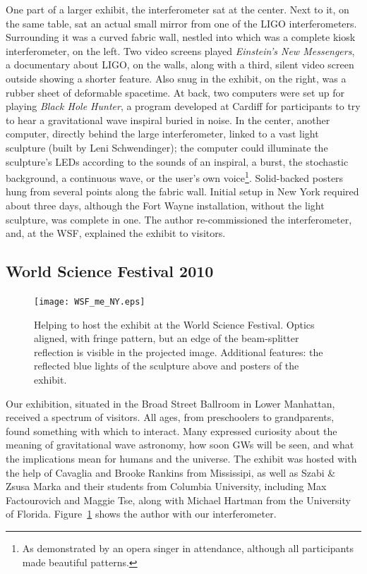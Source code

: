 One part of a larger exhibit, the interferometer sat at the center.
Next to it, on the same table, sat an actual small mirror from one of the LIGO interferometers.
Surrounding it was a curved fabric wall, nestled into which was a complete kiosk interferometer, on the left.
Two video screens played \textit{Einstein's New Messengers}, a documentary about LIGO, on the walls, along with a third, silent video screen outside showing a shorter feature.
Also snug in the exhibit, on the right, was a rubber sheet of deformable spacetime.
At back, two computers were set up for playing \textit{Black Hole Hunter}, a program developed at Cardiff for participants to try to hear a gravitational wave inspiral buried in noise.
In the center, another computer, directly behind the large interferometer, linked to a vast light sculpture (built by Leni Schwendinger); the computer could illuminate the sculpture's LEDs according to the sounds of an inspiral, a burst, the stochastic background, a continuous wave, or the user's own voice\footnote{As demonstrated by an opera singer in attendance, although all participants made beautiful patterns.}.
Solid-backed posters hung from several points along the fabric wall.
Initial setup in New York required about three days, although the Fort Wayne installation, without the light sculpture, was complete in one.
The author re-commissioned the interferometer, and, at the WSF, explained the exhibit to visitors.

        \subsection{World Science Festival 2010}
        \label{WSF2010}


	\begin{figure}
	\begin{center}
	\texttt{[image: WSF\_me\_NY.eps]}
	\caption{Helping to host the exhibit at the World Science Festival. Optics aligned, with fringe pattern, but an edge of the beam-splitter reflection is visible in the projected image. Additional features: the reflected blue lights of the sculpture above and posters of the exhibit.}
	\label{WSF_IFO_me}
	\end{center}
	\end{figure}

Our exhibition, situated in the Broad Street Ballroom in Lower Manhattan, received a spectrum of visitors.
All ages, from preschoolers to grandparents, found something with which to interact.
Many expressed curiosity about the meaning of gravitational wave astronomy, how soon GWs will be seen, and what the implications mean for humans and the universe.
The exhibit was hosted with the help of Cavaglia and Brooke Rankins from Mississipi, as well as Szabi \& Zsusa Marka and their students from Columbia University, including Max Factourovich and Maggie Tse, along with Michael Hartman from the University of Florida.
Figure~\ref{WSF_IFO_me} shows the author with our interferometer.

